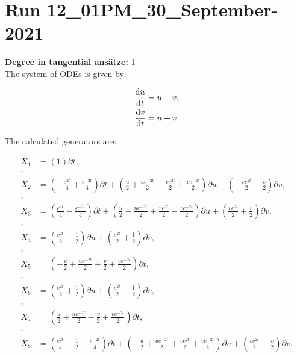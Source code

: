 \section*{Run 12\_01PM\_30\_September-2021}
\textbf{Degree in tangential ansätze:}	1\\
The system of ODEs is given by:

\begin{align*}
\dv{u}{t}&=u + v,\\
\dv{v}{t}&=u + v.\\
\end{align*}

\noindent The calculated generators are:

\begin{align*}
X_{1}&=\left( 1 \right)\partial t,\\
,\\
X_{2}&=\left( - \frac{e^{2 t}}{4} + \frac{e^{- 2 t}}{4} \right)\partial t+\left( \frac{u}{2} + \frac{u e^{- 2 t}}{2} - \frac{v e^{2 t}}{2} + \frac{v e^{- 2 t}}{2} \right)\partial u+\left( - \frac{v e^{2 t}}{2} + \frac{v}{2} \right)\partial v,\\
,\\
X_{3}&=\left( \frac{e^{2 t}}{4} - \frac{e^{- 2 t}}{4} \right)\partial t+\left( \frac{u}{2} - \frac{u e^{- 2 t}}{2} + \frac{v e^{2 t}}{2} - \frac{v e^{- 2 t}}{2} \right)\partial u+\left( \frac{v e^{2 t}}{2} + \frac{v}{2} \right)\partial v,\\
,\\
X_{4}&=\left( \frac{e^{2 t}}{2} - \frac{1}{2} \right)\partial u+\left( \frac{e^{2 t}}{2} + \frac{1}{2} \right)\partial v,\\
,\\
X_{5}&=\left( - \frac{u}{2} + \frac{u e^{- 2 t}}{2} + \frac{v}{2} + \frac{v e^{- 2 t}}{2} \right)\partial t,\\
,\\
X_{6}&=\left( \frac{e^{2 t}}{2} + \frac{1}{2} \right)\partial u+\left( \frac{e^{2 t}}{2} - \frac{1}{2} \right)\partial v,\\
,\\
X_{7}&=\left( \frac{u}{2} + \frac{u e^{- 2 t}}{2} - \frac{v}{2} + \frac{v e^{- 2 t}}{2} \right)\partial t,\\
,\\
X_{8}&=\left( \frac{e^{2 t}}{4} - \frac{1}{2} + \frac{e^{- 2 t}}{4} \right)\partial t+\left( - \frac{u}{2} + \frac{u e^{- 2 t}}{2} + \frac{v e^{2 t}}{2} + \frac{v e^{- 2 t}}{2} \right)\partial u+\left( \frac{v e^{2 t}}{2} - \frac{v}{2} \right)\partial v.\\
\end{align*}
